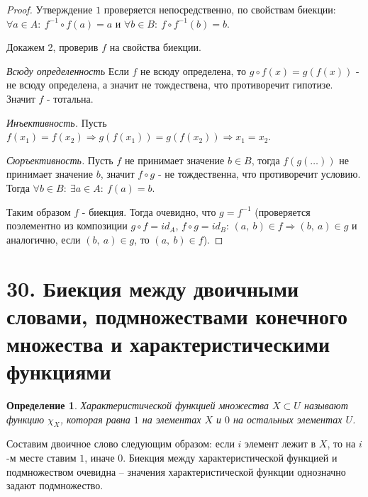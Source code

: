 \documentclass[a4paper,12pt]{article}
\newtheorem*{defin}{Определение}
\begin{document}
        \begin{proof}
            Утверждение $1$ проверяется непосредственно, по свойствам биекции: $\forall a \in A:\ f^{-1} \circ f(a) = a$ и
                     $\forall b \in B:\ f \circ f^{-1}(b) = b$.

            Докажем 2, проверив $f$ на свойства биекции.

            \textit{Всюду определенность}
            Если $f$ не всюду определена, то  $g \circ f(x) = g(f(x))$ - не всюду определена, а значит не тождествена, что противоречит гипотизе. Значит $f$ - тотальна.

            \textit{Инъективность.} 
            Пусть $f(x_1) = f(x_2) \Rightarrow g(f(x_1)) = g(f(x_2)) \Rightarrow x_1 = x_2$.

            \textit{Сюръективность.} 
            Пусть $f$ не принимает значение $b \in B$, тогда $f(g(\ldots))$ не принимает значение $b$, значит $f \circ g$ - не тождественна, что противоречит условию. Тогда $\forall b \in B:\ \exists a \in A:\ f(a) = b$.

            Таким образом $f$ - биекция. Тогда очевидно, что $g = f^{-1}$ (проверяется поэлементно из композиции $g \circ f = id_A$, $f \circ g = id_B$: $(a,\ b) \in f \Rightarrow (b,\ a) \in g$ и аналогично, если $(b,\ a) \in g$, то $(a,\ b) \in f$).
        \end{proof}

    \section*{30. Биекция между двоичными словами, подмножествами конечного множества и характеристическими функциями}

        \begin{defin}
            Характеристической функцией множества $X \subset U$ называют функцию $\displaystyle\chi_{X}$, которая равна $1$ на элементах $X$ и $0$ на остальных элементах $U$.
        \end{defin}
        Составим двоичное слово следующим образом: если $i$ элемент лежит в $X$, то на $i$-м месте ставим $1$, иначе $0$. Биекция между характеристической функцией и подмножеством очевидна -- значения характеристической функции однозначно задают подмножество.
\end{document}
